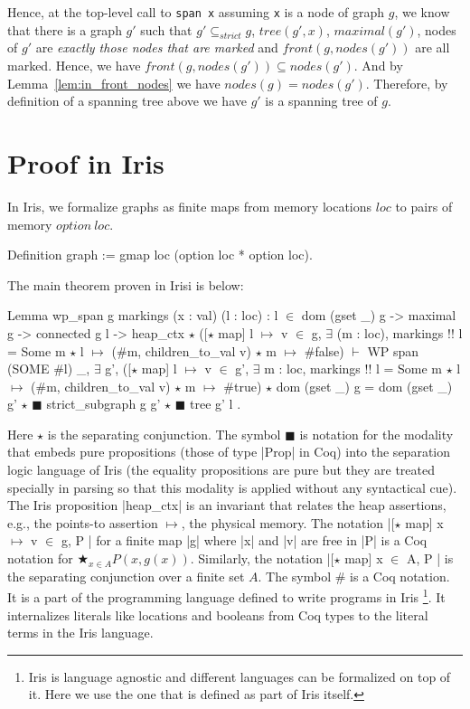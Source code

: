 \documentclass[nocopyrightspace]{sigplanconf}
\def\MyMLe{\lstinline[language=MyML, basicstyle=\small\ttfamily]}
\newcommand{\nodes}{\mathit{nodes}}
\newcommand{\front}{\mathit{front}}
\newcommand{\maximal}{\mathit{maximal}}
\newcommand{\tree}{\mathit{tree}}
\newcommand{\strictSG}{\subseteq_{\mathit{strict}}}
\newcommand{\loc}{\mathit{loc}}
\newcommand{\option}{\mathit{option}}
\begin{document}
Hence, at the top-level call to \MyMLe{span x} assuming \MyMLe{x} is a node of graph $g$, we know that there is a graph $g'$ such that
$g' \strictSG g$, $\tree(g', x)$, $\maximal(g')$, nodes of $g'$ are \emph{exactly those nodes that are marked} and $\front(g, \nodes(g'))$ are all marked.
Hence, we have $\front(g, \nodes(g')) \subseteq \nodes(g')$.
And by Lemma~\ref{lem:in_front_nodes} we have $\nodes(g) = \nodes(g')$.
Therefore, by definition of a spanning tree above we have $g'$ is a spanning tree
of $g$.

\section{Proof in Iris}
In Iris, we formalize graphs as finite maps from memory locations $\mathit{loc}$ to pairs of memory $\option~\loc$.
\begin{Coq}
Definition graph := gmap loc (option loc * option loc).
\end{Coq}

The main theorem proven in Irisi is  below:
\begin{Coq}
Lemma wp_span g markings (x : val) (l : loc) :
    l $\in$ dom (gset _) g -> maximal g -> connected g l ->
    heap_ctx $\star$
    ([$\star$ map] l $\mapsto$ v $\in$ g,
       $\exists$ (m : loc), markings !! l = Some m $\star$
          l $\mapsto$ ($\#$m, children_to_val v) $\star$ m $\mapsto$ $\#$false) $\vdash$
    WP span (SOME $\#$l)
    {{ _, $\exists$ g',
            ([$\star$ map] l $\mapsto$ v $\in$ g',
              $\exists$ m : loc, markings !! l = Some m $\star$
                l $\mapsto$ ($\#$m, children_to_val v) $\star$ m $\mapsto$ $\#$true)
           $\star$ dom (gset _) g = dom (gset _) g'
           $\star$ $\scriptscriptstyle\blacksquare$ strict_subgraph g g' $\star$ $\scriptscriptstyle\blacksquare$ tree g' l }}.
\end{Coq}
Here $\star$ is the separating conjunction. The symbol $\scriptscriptstyle\blacksquare$ is notation for the modality that
embeds pure propositions (those of type \Coqe|Prop| in Coq) into
the separation logic language of Iris (the equality propositions are pure but they are treated specially in parsing so that this modality is applied without any syntactical cue).
The Iris proposition \Coqe|heap_ctx| is an invariant that relates the heap
assertions, e.g., the points-to assertion $\mapsto$, the physical memory.
The notation \Coqe|[$\star$ map] x $
\mapsto$ v $\in$ g, P | for a finite map \Coqe|g| where \Coqe|x| and \Coqe|v| are free in \Coqe|P| is a Coq notation for $
\bigstar_{x \in A} P(x, g(x))$.
Similarly, the notation \Coqe|[$\star$ map] x $\in$ A, P | is the separating
conjunction over a finite set $A$.
The symbol $\#$ is a Coq notation. It is a part of the programming
language defined to write programs in Iris
\footnote{Iris is language agnostic and different languages can be formalized on top of it. Here we use the one that is defined as part of Iris itself.}.
It internalizes literals like locations and booleans from Coq types to the literal terms in the Iris language.
\end{document}
